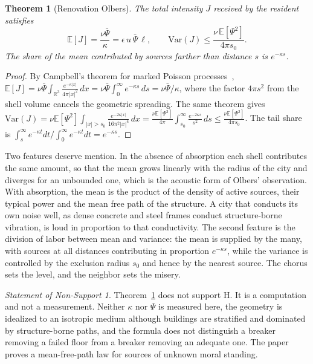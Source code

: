 \documentclass[11pt]{article}
\newtheorem{theorem}{Theorem}[section]
\theoremstyle{definition}
\theoremstyle{remark}
\newtheorem{nonsupport}{Statement of Non-Support}
\newcommand{\E}{\mathbb{E}}
\newcommand{\R}{\mathbb{R}}
\begin{document}
\begin{theorem}[Renovation Olbers]\label{thm:olbers}
The total intensity $J$ received by the resident satisfies
\begin{equation}\label{eq:olbers}
\E[J] = \frac{\nu\bar\Psi}{\kappa} = \epsilon\,u\,\bar\Psi\,\ell, \qquad \mathrm{Var}(J)\le\frac{\nu\,\E[\Psi^2]}{4\pi s_0}.
\end{equation}
The share of the mean contributed by sources farther than distance $s$ is $e^{-\kappa s}$.
\end{theorem}

\begin{proof}
By Campbell's theorem for marked Poisson processes~\cite{campbell,kingman}, $\E[J]=\nu\bar\Psi\int_{\R^3}\frac{e^{-\kappa|x|}}{4\pi|x|^2}\,dx = \nu\bar\Psi\int_0^\infty e^{-\kappa s}\,ds = \nu\bar\Psi/\kappa$, where the factor $4\pi s^2$ from the shell volume cancels the geometric spreading. The same theorem gives $\mathrm{Var}(J) = \nu\E[\Psi^2]\int_{|x|>s_0}\frac{e^{-2\kappa|x|}}{16\pi^2|x|^4}\,dx = \frac{\nu\E[\Psi^2]}{4\pi}\int_{s_0}^\infty\frac{e^{-2\kappa s}}{s^2}\,ds\le\frac{\nu\E[\Psi^2]}{4\pi s_0}$. The tail share is $\int_s^\infty e^{-\kappa t}dt\big/\int_0^\infty e^{-\kappa t}dt = e^{-\kappa s}$.
\end{proof}

Two features deserve mention. In the absence of absorption each shell contributes the same amount, so that the mean grows linearly with the radius of the city and diverges for an unbounded one, which is the acoustic form of Olbers' observation. With absorption, the mean is the product of the density of active sources, their typical power and the mean free path of the structure. A city that conducts its own noise well, as dense concrete and steel frames conduct structure-borne vibration, is loud in proportion to that conductivity. The second feature is the division of labor between mean and variance: the mean is supplied by the many, with sources at all distances contributing in proportion $e^{-\kappa s}$, while the variance is controlled by the exclusion radius $s_0$ and hence by the nearest source. The chorus sets the level, and the neighbor sets the misery.

\begin{nonsupport}\label{ns:olbers}
Theorem~\ref{thm:olbers} does not support H. It is a computation and not a measurement. Neither $\kappa$ nor $\Psi$ is measured here, the geometry is idealized to an isotropic medium although buildings are stratified and dominated by structure-borne paths, and the formula does not distinguish a breaker removing a failed floor from a breaker removing an adequate one. The paper proves a mean-free-path law for sources of unknown moral standing.
\end{nonsupport}
\end{document}
